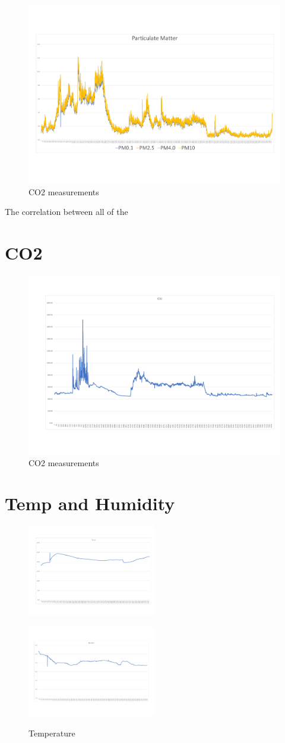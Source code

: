 \begin{figure}[!htb]
	\centering
	\includegraphics[width=0.7\linewidth]{body/fig/PMall.pdf}
	\caption{CO2 measurements}
	\label{fig:PMall}
\end{figure}

The correlation between all of the 




\section{CO2}
\begin{figure}[!htb]
	\centering
	\includegraphics[width=0.7\linewidth]{body/fig/CO2}
	\caption{CO2 measurements}
	\label{fig:co2}
\end{figure}
\section{Temp and Humidity}
\begin{figure}[!htb]
	\includegraphics[width=0.5\textwidth]{body/fig/Temp.pdf}%
	\caption{Temperature}
	\label{fig:temp}
	\includegraphics[width=0.5\textwidth]{body/fig/hum.pdf}%
	\label{fig:hum}
\end{figure}




